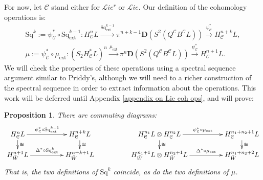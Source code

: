 \documentclass[11pt]{amsart} \renewcommand{\baselinestretch}{1.2}
\theoremstyle{plain}
\newtheorem{prop}[thm]{Proposition}
\numberwithin{equation}{section} %
\theoremstyle{plain}
\newtheorem{prop}[thm]{Proposition}
\numberwithin{equation}{chapter} %
\renewcommand{\to}{\longrightarrow}
\newcommand{\scrL}{\mathscr{L}}
\newcommand{\calc}{\mathcal{C}}
\newcommand{\ExtCohOp}{\mathrm{Sq}_\mathrm{ext}}
\newcommand{\ExtCohProd}{\mu_\mathrm{ext}}
\newcommand{\Sq}{\mathrm{Sq}}
\newcommand{\liealgs}{{\scrL\!\textit{ie}}}
\newcommand{\restliealgs}{{\scrL\!\textit{ie}^\textit{r}}}
\newcommand{\dual}{\mathbf{D}}
\begin{document}
\begin{Constructing cohomology operations}
For now, let $\calc$ stand either for $\restliealgs$ or $\liealgs$. Our definition of the cohomology operations is:
\begin{gather*}
\Sq^k:=\psi^*_{\calc}\circ\ExtCohOp^{k-1}:H_\calc^{n}L\overset{\ExtCohOp^{k-1}}{\to} \pi^{n+k-1}\dual(S^2(Q^\calc B^\calc L))\overset{\psi_\calc^*}{\to} H_\calc^{n+k}L,\\
\mu:=\psi^*_{\calc}\circ\ExtCohProd:(S_2 H_\calc^{*}L)^{n}\overset{\ExtCohProd}{\to} \pi^{n}\dual(S^2(Q^\calc B^\calc L))\overset{\psi_\calc^*}{\to} H_\calc^{n+1}L.
\end{gather*}
We will check the properties of these operations using a spectral sequence argument similar to Priddy's, although we will need to a richer construction of the spectral sequence in order to extract information about the operations. This work will be deferred until Appendix \ref{appendix on Lie coh ops}, and will prove:
\begin{prop}
\label{all the lie steenrod ops are the same}
There are commuting diagrams:
\[\xymatrix@R=4mm@C=17mm{
H^n_\calc L
\ar[d]^-{\cong}
\ar[r]^-{\psi^*_{\calc}\circ\ExtCohOp^{k-1}}&%
H^{n+k}_\calc L
\ar[d]^-{\cong}
&
H^{n_1}_\calc L\otimes H^{n_2}_\calc L
\ar[d]^-{\cong}
\ar[r]^-{\psi^*_{\calc}\circ\ExtCohProd}&%
H^{n_1+n_2+1}_\calc L
\ar[d]^-{\cong}
\\%
H^{n+1}_{\bar{W}} L
\ar[r]^-{\Delta^*\circ\ExtCohOp^k}&%
H^{n+k+1}_{\bar{W}} L%
&
H^{n_1+1}_{\bar{W}} L\otimes H^{n_2+1}_{\bar{W}} L
\ar[r]^-{\Delta^*\circ\ExtCohProd}&%
H^{n_1+n_2+2}_{\bar{W}} L%
}\]
That is, the two definitions of $\Sq^k$ coincide, as do the two definitions of $\mu$.
\end{prop}


\end{Constructing cohomology operations}
\end{document}
